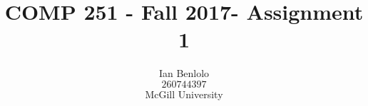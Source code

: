 
\usepackage{appendix}
\usepackage{color,soul}
\usepackage{amsmath}
\newenvironment{tightcenter}{%
  \setlength\topsep{0pt}
  \setlength\parskip{0pt}
  \begin{center}
}{%
  \end{center}
}
\usepackage{enumerate}
\title{COMP 251 - Fall 2017- Assignment 1}
\author{Ian Benlolo\\$260744397$\\McGill University \\}




\maketitle


